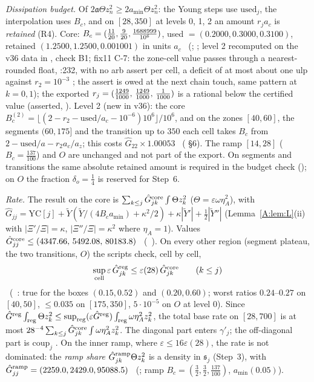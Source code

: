 \documentclass[11pt]{article}
\begin{document}
\emph{Dissipation budget.} Of $2\mathfrak a\Theta z_n^2\ge2a_{\min}\Theta z_n^2$: the Young steps use $\mathrm{used}_j$, the interpolation uses $B_c$, and on $[28,350]$ at levels 0, 1, 2 an amount $r_ja_c$ is \emph{retained} (R4). Core: $B_c=(\frac{11}{20},\frac9{20},\tfrac{1688999}{10^6})$, used $=(0.2000,0.3000,0.3100)$, retained $(1.2500,1.2500,0.001001)$ in units $a_c$ \tC\ (;  ; level 2 recomputed on the v36 data in , check B1; fix11 C-7: the zone-cell value  passes through a nearest-rounded float, :232, with no arb assert per cell, a deficit of at most about one ulp against $r_2=10^{-3}$ \tHd; the assert is owed at the next chain touch, same pattern at $k=0,1$); the exported $r_j=(\tfrac{1249}{1000},\,\tfrac{1249}{1000},\,\tfrac1{1000})$ is a rational below the certified value (asserted, ). Level 2 (new in v36): the core $B_c^{(2)}=\lfloor(2-r_2-\mathrm{used}/a_c-10^{-6})10^6\rfloor/10^6$, and on the zones $[40,60]$, the segments $(60,175]$ and the transition up to $350$ each cell takes $B_c$ from $2-\mathrm{used}/a-r_2a_c/a_z$; this costs $\hat G_{22}\times1.00053$ \tC\ ( \S6). The ramp $[14,28]$ ($B_c=\frac{137}{100}$) and $O$ are unchanged and not part of the export. On segments and transitions the same absolute retained amount is required in the budget check (); on $O$ the fraction $\delta_o=\frac14$ is reserved for Step~6.

\emph{Rate.} The result on the core is $\sum_{k\le j}\hat G^{\rm core}_{jk}\int\Theta z_k^2$ ($\Theta=\varepsilon\omega\eta_A^2$), with $\hat G_{jj}=\mathrm{YC}[j]+\tilde Y(\tilde Y/(4B_ca_{\min})+\kappa^2/2)+\kappa|\tilde Y'|+\frac12|\tilde Y''|$ (Lemma~\ref{A:lem:L}(ii) with $|\Xi'/\Xi|=\kappa$, $|\Xi''/\Xi|=\kappa^2$ where $\eta_A=1$). Values $\hat G^{\rm core}_{jj}\le(4347.66,\,5492.08,\,80183.8)$ \tC\ (\SA\ ). On every other region (segment plateau, the two transitions, $O$) the scripts check, cell by cell,
\[
\sup_{\rm cell}\varepsilon\,\hat G^{\rm reg}_{jk}\le\varepsilon(28)\,\hat G^{\rm core}_{jk}\qquad(k\le j)
\]
\tC\ (\SA\ :  true for the boxes $(0.15,0.52)$ and $(0.20,0.60)$; worst ratios $0.24$--$0.27$ on $[40,50]$, $\le0.035$ on $[175,350]$, $5\cdot10^{-5}$ on $O$ at level 0). Since $\hat G^{\rm reg}\int_{\rm reg}\Theta z_k^2\le\sup_{\rm reg}(\varepsilon\hat G^{\rm reg})\int_{\rm reg}\omega\eta_A^2z_k^2$, the total base rate on $[28,700]$ is at most $28^{-4}\sum_{k\le j}\hat G^{\rm core}_{jk}\int\omega\eta_A^2z_k^2$. The diagonal part enters $\gamma'_j$; the off-diagonal part is $\mathrm{coup}_j$ \tP. On the inner ramp, where $\varepsilon\le16\varepsilon(28)$, the rate is not dominated: the \emph{ramp share} $\hat G^{\rm ramp}_{jk}\Theta z_k^2$ is a density in $\mathfrak s_j$ (Step~3), with $\hat G^{\rm ramp}_{jj}=(2259.0,2429.0,95088.5)$ \tC\ (; ramp $B_c=(\frac32,\frac32,\frac{137}{100})$, $a_{\min}(0.05)$).
\end{document}
